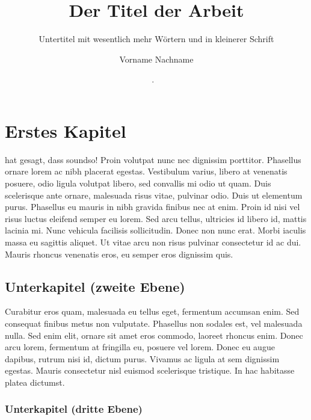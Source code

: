 \documentclass[12pt,a4paper,parskip=half]{scrartcl}
\begin{document}
  \title{Der Titel der Arbeit}
  \subtitle{Untertitel mit wesentlich mehr Wörtern und in kleinerer Schrift}
  \author{Vorname Nachname}
  \date{\the\day. \monthnamengerman\ \the\year}
  \makeheader


\section{Erstes Kapitel}

\cite{L¹} hat gesagt, dass soundso! Proin volutpat nunc nec dignissim porttitor. Phasellus ornare lorem ac nibh placerat egestas. Vestibulum varius, libero at venenatis posuere, odio ligula volutpat libero, sed convallis mi odio ut quam. Duis scelerisque ante ornare, malesuada risus vitae, pulvinar odio. Duis ut elementum purus. Phasellus eu mauris in nibh gravida finibus nec at enim. Proin id nisi vel risus luctus eleifend semper eu lorem. Sed arcu tellus, ultricies id libero id, mattis lacinia mi. Nunc vehicula facilisis sollicitudin. Donec non nunc erat. Morbi iaculis massa eu sagittis aliquet. Ut vitae arcu non risus pulvinar consectetur id ac dui. Mauris rhoncus venenatis eros, eu semper eros dignissim quis.

\subsection{Unterkapitel (zweite Ebene)}

Curabitur eros quam, malesuada eu tellus eget, fermentum accumsan enim. Sed consequat finibus metus non vulputate. Phasellus non sodales est, vel malesuada nulla. Sed enim elit, ornare sit amet eros commodo, laoreet rhoncus enim. Donec arcu lorem, fermentum at fringilla eu, posuere vel lorem. Donec eu augue dapibus, rutrum nisi id, dictum purus. Vivamus ac ligula at sem dignissim egestas. Mauris consectetur nisl euismod scelerisque tristique. In hac habitasse platea dictumst.

\subsubsection{Unterkapitel (dritte Ebene)}
\end{document}

